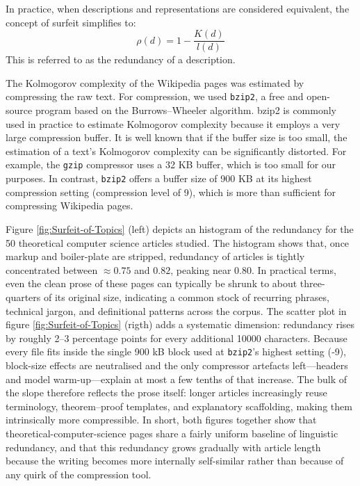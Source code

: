 In practice, when descriptions and representations are considered equivalent, the concept of surfeit simplifies to:
\[
\rho(d) = 1 - \frac{K(d)}{l(d)}
\]
This is referred to as the redundancy of a description.

The Kolmogorov complexity of the Wikipedia pages was estimated by compressing the raw text. For compression, we used \texttt{bzip2}, a free and open-source program based on the Burrows–Wheeler algorithm. bzip2 is commonly used in practice to estimate Kolmogorov complexity because it employs a very large compression buffer. It is well known that if the buffer size is too small, the estimation of a text's Kolmogorov complexity can be significantly distorted. For example, the \texttt{gzip} compressor uses a 32 KB buffer, which is too small for our purposes. In contrast, \texttt{bzip2} offers a buffer size of 900 KB at its highest compression setting (compression level of 9), which is more than sufficient for compressing Wikipedia pages.

Figure \ref{fig:Surfeit-of-Topics} (left) depicts an histogram of the redundancy for the 50 theoretical computer science articles studied. The histogram shows that, once markup and boiler-plate are stripped, redundancy of articles is tightly concentrated between $\approx 0.75$ and $0.82$, peaking near $0.80$. In practical terms, even the clean prose of these pages can typically be shrunk to about three-quarters of its original size, indicating a common stock of recurring phrases, technical jargon, and definitional patterns across the corpus. The scatter plot in figure \ref{fig:Surfeit-of-Topics} (rigth) adds a systematic dimension: redundancy rises by roughly 2–3 percentage points for every additional 10000 characters. Because every file fits inside the single 900 kB block used at \texttt{bzip2}’s highest setting (‐9), block-size effects are neutralised and the only compressor artefacts left—headers and model warm-up—explain at most a few tenths of that increase. The bulk of the slope therefore reflects the prose itself: longer articles increasingly reuse terminology, theorem–proof templates, and explanatory scaffolding, making them intrinsically more compressible. In short, both figures together show that theoretical-computer-science pages share a fairly uniform baseline of linguistic redundancy, and that this redundancy grows gradually with article length because the writing becomes more internally self-similar rather than because of any quirk of the compression tool.

